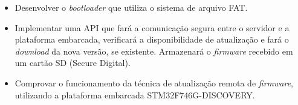  \begin{itemize}
   \item Desenvolver o \textit{bootloader} que utiliza o sistema de arquivo FAT.
   
   
   \item Implementar uma API que fará a comunicação segura entre o servidor e a plataforma embarcada, verificará a disponibilidade de atualização e fará o \textit{download} da nova versão, se existente. Armazenará o \textit{firmware} recebido em um cartão SD (Secure Digital). 
   
   \item Comprovar o funcionamento da técnica de atualização remota de \textit{firmware}, utilizando a plataforma embarcada STM32F746G-DISCOVERY.
   
 \end{itemize}
 
